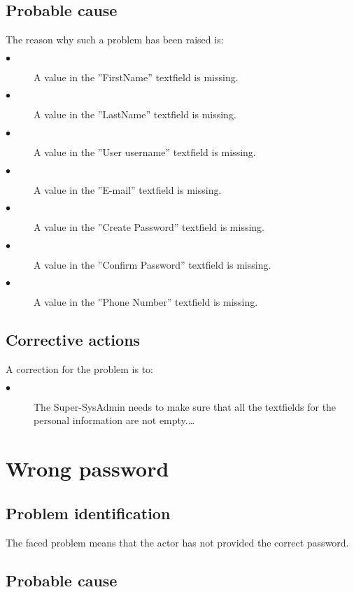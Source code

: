 \subsection{Probable cause}

The reason why such a problem has been raised is:\\
\begin{description}
\item[$\bullet$] A value in the ''FirstName'' textfield is missing.
\item[$\bullet$] A value in the ''LastName'' textfield is missing.
\item[$\bullet$] A value in the ''User username'' textfield is missing.
\item[$\bullet$] A value in the ''E-mail'' textfield is missing.
\item[$\bullet$] A value in the ''Create Password'' textfield is missing.
\item[$\bullet$] A value in the ''Confirm Password'' textfield is missing.
\item[$\bullet$] A value in the ''Phone Number'' textfield is missing.

\end{description}


\subsection{Corrective actions}

A correction for the problem is to:\\
\begin{description}
\item[$\bullet$] The Super-SysAdmin needs to make sure that all the textfields
for the personal information are not empty.\ldots

\end{description}


\section{Wrong password} 

\subsection{Problem identification}
The faced problem means that the actor has not provided the correct password.

\subsection{Probable cause}

